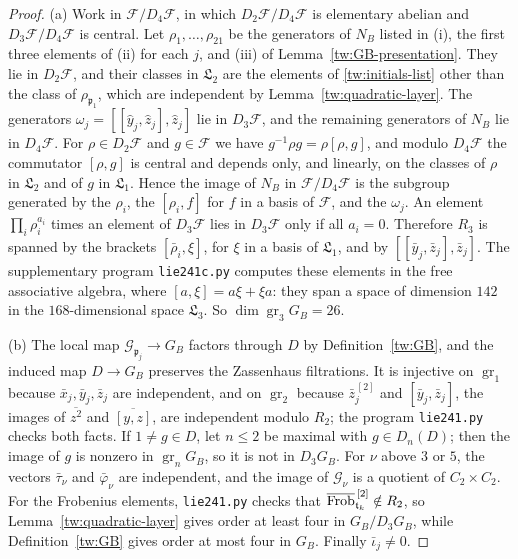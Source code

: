 \begin{proof}
(a) Work in $\mathcal F/D_4\mathcal F$, in which $D_2\mathcal F/D_4\mathcal F$
is elementary abelian and $D_3\mathcal F/D_4\mathcal F$ is central. Let
$\rho_1,\dots,\rho_{21}$ be the generators of $N_B$ listed in (i), the first
three elements of (ii) for each $j$, and (iii) of
Lemma~\ref{tw:GB-presentation}. They lie in $D_2\mathcal F$, and their classes
in $\mathfrak L_2$ are the elements of \eqref{tw:initials-list} other than the
class of $\rho_{\mathfrak p_1}$, which are independent by
Lemma~\ref{tw:quadratic-layer}. The generators
$\omega_j=[[\hat y_j,\hat z_j],\hat z_j]$ lie in $D_3\mathcal F$, and the
remaining generators of $N_B$ lie in $D_4\mathcal F$. For $\rho\in D_2\mathcal F$ and $g\in\mathcal F$ we have
$g^{-1}\rho g=\rho[\rho,g]$, and modulo $D_4\mathcal F$ the commutator
$[\rho,g]$ is central and depends only, and linearly, on the classes of
$\rho$ in $\mathfrak L_2$ and of $g$ in $\mathfrak L_1$. Hence the image of
$N_B$ in $\mathcal F/D_4\mathcal F$ is the subgroup generated by the $\rho_i$,
the $[\rho_i,f]$ for $f$ in a basis of $\mathcal F$, and the $\omega_j$. An
element $\prod_i\rho_i^{a_i}$ times an element of $D_3\mathcal F$ lies in
$D_3\mathcal F$ only if all $a_i=0$. Therefore $R_3$ is spanned by the
brackets $[\bar\rho_i,\xi]$, for $\xi$ in a basis of $\mathfrak L_1$, and by
$[[\bar y_j,\bar z_j],\bar z_j]$. The supplementary program
\texttt{lie241c.py} computes these elements in the free associative algebra,
where $[a,\xi]=a\xi+\xi a$: they span a space of dimension $142$ in the
$168$-dimensional space $\mathfrak L_3$. So $\dim\operatorname{gr}_3G_B=26$.

(b) The local map $\mathcal G_{\mathfrak p_j}\to G_B$ factors through $D$ by
Definition~\ref{tw:GB}, and the induced map $D\to G_B$ preserves the
Zassenhaus filtrations. It is injective on $\operatorname{gr}_1$ because
$\bar x_j,\bar y_j,\bar z_j$ are independent, and on $\operatorname{gr}_2$
because $\bar z_j^{\,[2]}$ and $[\bar y_j,\bar z_j]$, the images of
$\overline{z^2}$ and $\overline{[y,z]}$, are independent modulo $R_2$; the
program \texttt{lie241.py} checks both facts. If $1\neq g\in D$, let $n\le2$
be maximal with $g\in D_n(D)$; then the image of $g$ is nonzero in
$\operatorname{gr}_nG_B$, so it is not in $D_3G_B$. For $\nu$ above $3$ or
$5$, the vectors $\bar\tau_\nu$ and $\bar\varphi_\nu$ are independent, and the
image of $\mathcal G_\nu$ is a quotient of $C_2\times C_2$. For the Frobenius
elements, \texttt{lie241.py} checks that
$\overline{\operatorname{Frob}}_{\mathfrak t_k}^{\,[2]}\notin R_2$, so
Lemma~\ref{tw:quadratic-layer} gives order at least four in $G_B/D_3G_B$,
while Definition~\ref{tw:GB} gives order at most four in $G_B$. Finally
$\bar\iota_j\neq0$.


\end{proof}
